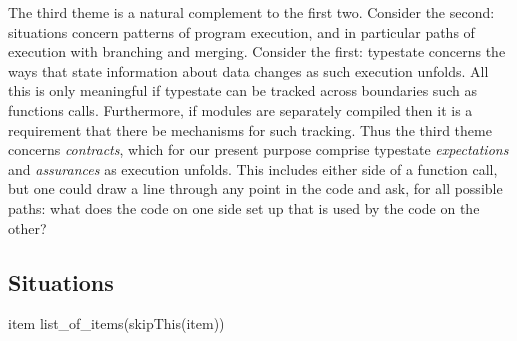 \documentclass[10pt]{amsart}
\begin{document}
The third theme is a natural complement to the first two.  Consider
the second: situations concern patterns of program execution, and in
particular paths of execution with branching and merging.  Consider
the first: typestate concerns the ways that state information about
data changes as such execution unfolds.  All this is only meaningful
if typestate can be tracked across boundaries such as functions calls.
Furthermore, if modules are separately compiled then it is a
requirement that there be mechanisms for such tracking.  Thus the
third theme concerns \emph{contracts}, which for our present purpose
comprise typestate \emph{expectations} and \emph{assurances} as
execution unfolds.  This includes either side of a function call, but
one could draw a line through any point in the code and ask, for all
possible paths: what does the code on one side set up that is used by
the code on the other?


\subsection{Situations}


\begin{codex}
\begin{offsideBlue}
\begin{PVerbatim}
  \ckw[loop] item \ckw[through] list_of_items\cop[:]
     \ckw[if] (skipThis(item))\cop[:]
        \cgoto\csituation[ItemNotRelevant]
     \cend
  \csitop\csituation[ItemNotRelevant]\cop[:]                      
  \cend
\end{PVerbatim}
\end{offsideBlue}
\end{codex}
\end{document}
